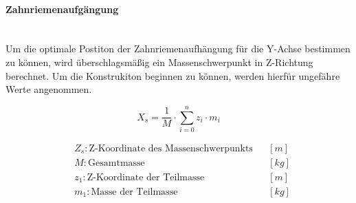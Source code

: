 \paragraph{Zahnriemenaufgängung}\mbox{}\\
Um die optimale Postiton der Zahnriemenaufhängung für die Y-Achse bestimmen zu können, wird überschlagsmäßig ein Massenschwerpunkt in Z-Richtung berechnet. Um die Konstrukiton beginnen zu können, werden hierfür ungefähre Werte angenommen.

\noindent\begin{minipage}{\textwidth}
\begin{minipage}[t]{0.5\textwidth}
    \vspace{7mm}
    \begin{equation*}
        X_s = \frac{1}{M} \cdot \displaystyle\sum_{i = 0}^{n} z_i \cdot m_i
    \end{equation*}
\end{minipage}%
\begin{minipage}[t]{0.5\textwidth}
    \begin{align*}
        &Z_s: \text{Z-Koordinate des Massenschwerpunkts} & &\left[m\right]\\
        &M: \text{Gesamtmasse} & &\left[kg\right]\\
        &z_1: \text{Z-Koordinate der Teilmasse} & &\left[m\right] \\
        &m_1: \text{Masse der Teilmasse} & &\left[kg\right]
    \end{align*}
\end{minipage}
\end{minipage}

